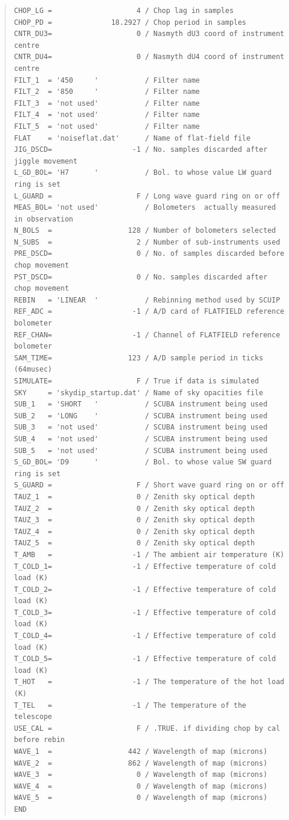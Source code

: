 \documentclass[twoside,11pt]{article}
\newenvironment{myquote}{\begin{quote}\begin{small}}{\end{small}\end{quote}}
\renewcommand{\_}{\texttt{\symbol{95}}}
\begin{document}
\begin{myquote}
\begin{verbatim}
CHOP_LG =                    4 / Chop lag in samples
CHOP_PD =              18.2927 / Chop period in samples
CNTR_DU3=                    0 / Nasmyth dU3 coord of instrument centre
CNTR_DU4=                    0 / Nasmyth dU4 coord of instrument centre
FILT_1  = '450     '           / Filter name
FILT_2  = '850     '           / Filter name
FILT_3  = 'not used'           / Filter name
FILT_4  = 'not used'           / Filter name
FILT_5  = 'not used'           / Filter name
FLAT    = 'noiseflat.dat'      / Name of flat-field file
JIG_DSCD=                   -1 / No. samples discarded after jiggle movement
L_GD_BOL= 'H7      '           / Bol. to whose value LW guard ring is set
L_GUARD =                    F / Long wave guard ring on or off
MEAS_BOL= 'not used'           / Bolometers  actually measured in observation
N_BOLS  =                  128 / Number of bolometers selected
N_SUBS  =                    2 / Number of sub-instruments used
PRE_DSCD=                    0 / No. of samples discarded before chop movement
PST_DSCD=                    0 / No. samples discarded after chop movement
REBIN   = 'LINEAR  '           / Rebinning method used by SCUIP
REF_ADC =                   -1 / A/D card of FLATFIELD reference bolometer
REF_CHAN=                   -1 / Channel of FLATFIELD reference bolometer
SAM_TIME=                  123 / A/D sample period in ticks (64musec)
SIMULATE=                    F / True if data is simulated
SKY     = 'skydip_startup.dat' / Name of sky opacities file
SUB_1   = 'SHORT   '           / SCUBA instrument being used
SUB_2   = 'LONG    '           / SCUBA instrument being used
SUB_3   = 'not used'           / SCUBA instrument being used
SUB_4   = 'not used'           / SCUBA instrument being used
SUB_5   = 'not used'           / SCUBA instrument being used
S_GD_BOL= 'D9      '           / Bol. to whose value SW guard ring is set
S_GUARD =                    F / Short wave guard ring on or off
TAUZ_1  =                    0 / Zenith sky optical depth
TAUZ_2  =                    0 / Zenith sky optical depth
TAUZ_3  =                    0 / Zenith sky optical depth
TAUZ_4  =                    0 / Zenith sky optical depth
TAUZ_5  =                    0 / Zenith sky optical depth
T_AMB   =                   -1 / The ambient air temperature (K)
T_COLD_1=                   -1 / Effective temperature of cold load (K)
T_COLD_2=                   -1 / Effective temperature of cold load (K)
T_COLD_3=                   -1 / Effective temperature of cold load (K)
T_COLD_4=                   -1 / Effective temperature of cold load (K)
T_COLD_5=                   -1 / Effective temperature of cold load (K)
T_HOT   =                   -1 / The temperature of the hot load (K)
T_TEL   =                   -1 / The temperature of the telescope
USE_CAL =                    F / .TRUE. if dividing chop by cal before rebin
WAVE_1  =                  442 / Wavelength of map (microns)
WAVE_2  =                  862 / Wavelength of map (microns)
WAVE_3  =                    0 / Wavelength of map (microns)
WAVE_4  =                    0 / Wavelength of map (microns)
WAVE_5  =                    0 / Wavelength of map (microns)
END
\end{verbatim}
\end{myquote}
\end{document}
